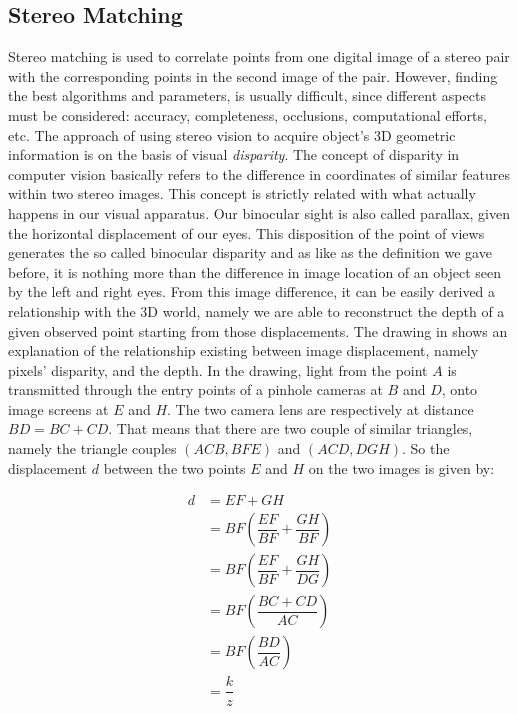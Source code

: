 \subsection{Stereo Matching}\label{subsec:stereomatching}
Stereo matching is used to correlate points from one digital image of a stereo pair with the corresponding points in the second image of the pair. However, finding the best algorithms and parameters, is usually difficult, since different aspects must be considered: accuracy, completeness, occlusions, computational efforts, etc. The approach of using stereo vision to acquire object's 3D geometric information is on the basis of visual \emph{disparity}. The concept of disparity in computer vision basically refers to the difference in coordinates of similar features within two stereo images. This concept is strictly related with what actually happens in our visual apparatus. Our binocular sight is also called parallax, given the horizontal displacement of our eyes. This disposition of the point of views generates the so called binocular disparity and as like as the definition we gave before, it is nothing more than the difference in image location of an object seen by the left and right eyes. From this image difference, it can be easily derived a relationship with the 3D world, namely we are able to reconstruct the depth of a given observed point starting from those displacements. The drawing in  shows an explanation of the relationship existing between image displacement, namely pixels' disparity, and the depth. In the drawing, light from the point $A$ is transmitted through the entry points of a pinhole cameras at $B$ and $D$, onto image screens at $E$ and $H$. The two camera lens are respectively at distance $BD = BC + CD$. That means that there are two couple of similar triangles, namely the triangle couples $(ACB, BFE)$ and $(ACD, DGH)$. So the displacement $d$ between the two points $E$ and $H$ on the two images is given by:

\begin{equation}
    \label{eq:disparity}
    \begin{aligned}
    d &= EF + GH \\
      &= BF(\dfrac{EF}{BF} + \dfrac{GH}{BF}) \\
      &= BF(\dfrac{EF}{BF} + \dfrac{GH}{DG}) \\ 
      &= BF(\dfrac{BC+CD}{AC}) \\
      &= BF(\dfrac{BD}{AC}) \\
      &= \dfrac{k}{z}
    \end{aligned}
\end{equation}

